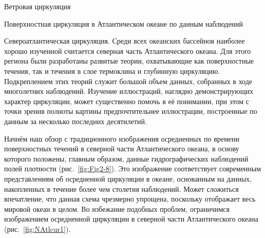 \begin{chapter}{Ветровая циркуляция}
\begin{section}{Поверхностная циркуляция в Атлантическом океане по данным наблюдений}
\begin{paragraph}{Североатлантическая циркуляция.}
Среди всех океанских бассейнов наиболее
хорошо изученной считается северная часть Атлантического океана. Для этого
региона были разработаны развитые теории, охватывающие как поверхностные
течения, так и течения в слое термоклина
и глубинную циркуляцию. Подкреплением этих теорий служит большой объем
данных, собранных в ходе многолетних наблюдений. Изучение иллюстраций, 
наглядно демонстрирующих характер циркуляции, может существенно помочь в её
понимании, при этом с точки зрения полноты картины предпочтительнее 
иллюстрации, построенные по данным за несколько последних десятилетий.
%

Начнём наш обзор с традиционного изображения осредненных по времени 
поверхностных течений в северной части Атлантического океана, в основу которого
положены, главным образом, данные гидрографических наблюдений%
полей плотности (рис.~\ref{fig:Fig2-8}). Это изображение соответствует
современным представлениям об осредненной циркуляции в океане, 
основанным на данных, накопленных в течение более чем столетия наблюдений.
Может сложиться впечатление, что данная схема чрезмерно упрощена, поскольку
отображает весь мировой океан в целом. Во избежание подобных проблем,
ограничимся изображением осредненной циркуляции в северной части 
Атлантического океана (рис.~\ref{fig:NAtlcur1}).
%


\end{paragraph}
\end{section}
\end{chapter}
